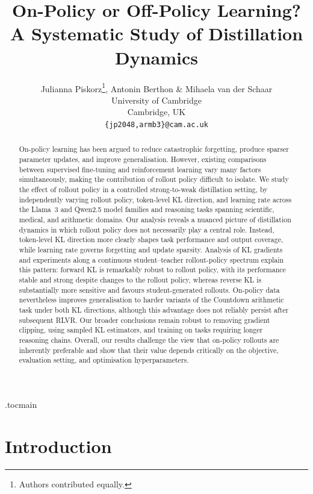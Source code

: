 \documentclass{article} %
\title{On-Policy or Off-Policy Learning? \\ A Systematic Study of Distillation Dynamics}
\author{
Julianna Piskorz\thanks{Authors contributed equally.},\hspace{0.2em}
Antonin Berthon\footnotemark[1] \hspace{0.2em} \&
Mihaela van der Schaar\\
University of Cambridge\\
Cambridge, UK\\
\texttt{\{jp2048,armb3\}@cam.ac.uk}
}
\theoremstyle{plain}
\theoremstyle{definition}
\theoremstyle{remark}
\begin{document}
\maketitle

\etocdepthtag.toc{main}

\begin{abstract}
On-policy learning has been argued to reduce catastrophic forgetting, produce sparser parameter updates, and improve generalisation. However, existing comparisons between supervised fine-tuning and reinforcement learning vary many factors simultaneously, making the contribution of rollout policy difficult to isolate. We study the effect of rollout policy in a controlled strong-to-weak distillation setting, by independently varying rollout policy, token-level KL direction, and learning rate across the Llama~3 and Qwen2.5 model families and reasoning tasks spanning scientific, medical, and arithmetic domains. Our analysis reveals a nuanced picture of distillation dynamics in which rollout policy does not necessarily play a central role. Instead, token-level KL direction more clearly shapes task performance and output coverage, while learning rate governs forgetting and update sparsity. Analysis of KL gradients and experiments along a continuous student--teacher rollout-policy spectrum explain this pattern: forward KL is remarkably robust to rollout policy, with its performance stable and strong despite changes to the rollout policy, whereas reverse KL is substantially more sensitive and favours student-generated rollouts. On-policy data nevertheless improves generalisation to harder variants of the Countdown arithmetic task under both KL directions, although this advantage does not reliably persist after subsequent RLVR. Our broader conclusions remain robust to removing gradient clipping, using sampled KL estimators, and training on tasks requiring longer reasoning chains. Overall, our results challenge the view that on-policy rollouts are inherently preferable and show that their value depends critically on the objective, evaluation setting, and optimisation hyperparameters.
\end{abstract}

\section{Introduction}
\end{document}
